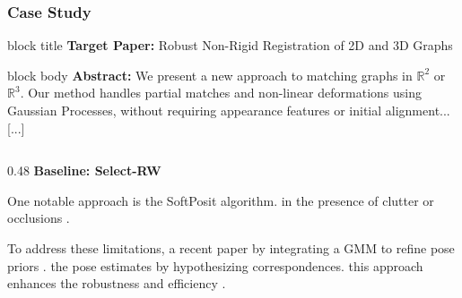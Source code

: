 \begin{frame}[t]
\frametitle{Case Study}
\vspace{2mm}

\begin{beamercolorbox}[wd=\textwidth, sep=3pt, rounded=true]{block title}
    \scriptsize \textbf{Target Paper:} Robust Non-Rigid Registration of 2D and 3D Graphs
\end{beamercolorbox}
\begin{beamercolorbox}[wd=\textwidth, sep=4pt, rounded=true]{block body}
    \tiny \textbf{Abstract:} We present a new approach to matching graphs in $\mathbb{R}^2$ or $\mathbb{R}^3$. Our method handles partial matches and non-linear deformations using Gaussian Processes, without requiring appearance features or initial alignment... [...]
\end{beamercolorbox}

\vspace{-1mm}
\begin{columns}[T, onlytextwidth]
    \begin{column}{0.48\textwidth}
        \centering
        {\scriptsize \color{hustprimary} \textbf{Baseline: Select-RW \cite{liu2025select}}} \par
        \vspace{1mm}
        \begin{minipage}[t][4.2cm]{\textwidth}
            \tiny \raggedright
              One notable approach is the SoftPosit algorithm.   in the presence of clutter or occlusions \redhl{\textbf{[3755653]}}.
            \vspace{1mm} \par
            To address these limitations, a recent paper   by integrating a GMM to refine pose priors \redhl{\textbf{[3755653]}}.  the pose estimates by hypothesizing correspondences.   this approach enhances the robustness and efficiency \redhl{\textbf{[3755653]}}.
        \end{minipage}
    \end{column}


\end{columns}
\end{frame}
